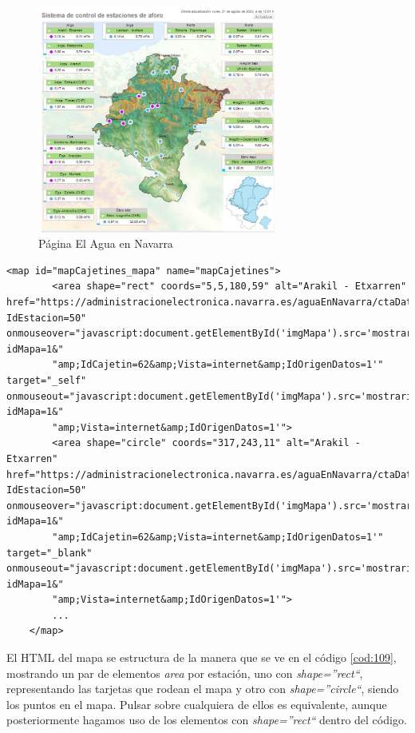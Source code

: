 \begin{figure} [H]
	\centering
	\includegraphics[width=0.7\textwidth]{fig/AguaEnNavarraCode.png}
	\caption[Página principal de aforos de El Agua en Navarra]{Página El Agua en Navarra}
	\label{fig:ej4}
\end{figure}

\begin{lstlisting}[basicstyle=\footnotesize, caption={HTML mapa estaciones en El Agua en Navarra}, label=cod:109]
	<map id="mapCajetines_mapa" name="mapCajetines">
		<area shape="rect" coords="5,5,180,59" alt="Arakil - Etxarren" href="https://administracionelectronica.navarra.es/aguaEnNavarra/ctaDatosEstacion.aspx?IdEstacion=50" onmouseover="javascript:document.getElementById('imgMapa').src='mostrarimagen.aspx?idMapa=1&"
		"amp;IdCajetin=62&amp;Vista=internet&amp;IdOrigenDatos=1'" target="_self" onmouseout="javascript:document.getElementById('imgMapa').src='mostrarimagen.aspx?idMapa=1&"
		"amp;Vista=internet&amp;IdOrigenDatos=1'">
		<area shape="circle" coords="317,243,11" alt="Arakil - Etxarren" href="https://administracionelectronica.navarra.es/aguaEnNavarra/ctaDatosEstacion.aspx?IdEstacion=50" onmouseover="javascript:document.getElementById('imgMapa').src='mostrarimagen.aspx?idMapa=1&"
		"amp;IdCajetin=62&amp;Vista=internet&amp;IdOrigenDatos=1'" target="_blank" onmouseout="javascript:document.getElementById('imgMapa').src='mostrarimagen.aspx?idMapa=1&"
		"amp;Vista=internet&amp;IdOrigenDatos=1'">
		...
	</map>
\end{lstlisting}

El HTML del mapa se estructura de la manera que se ve en el código \ref{cod:109}, mostrando un par de elementos \textit{area} por estación, uno con \textit{shape=''rect``}, representando las tarjetas que rodean el mapa y otro con \textit{shape=''circle``}, siendo los puntos en el mapa. Pulsar sobre cualquiera de ellos es equivalente, aunque posteriormente hagamos uso de los elementos con \textit{shape=''rect``} dentro del código.

